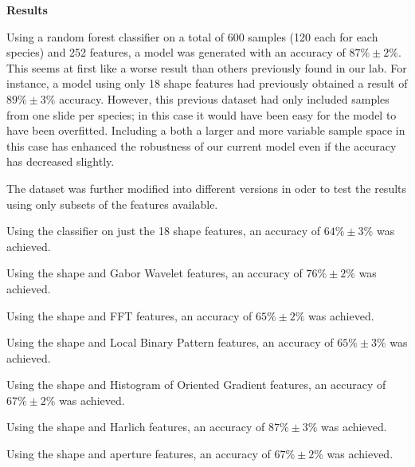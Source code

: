 \textbf{Results}

Using a random forest classifier on a total of 600 samples (120 each for each species) and 252 features, a model was generated with an accuracy of $87\% \pm 2\%$. This seems at first like a worse result than others previously found in our lab. For instance, a model using only 18 shape features had previously obtained a result of $89\% \pm 3\%$ accuracy. However, this previous dataset had only included samples from one slide per species; in this case it would have been easy for the model to have been overfitted. Including a both a larger and more variable sample space in this case has enhanced the robustness of our current model even if the accuracy has decreased slightly.

The dataset was further modified into different versions in oder to test the results using only subsets of the features available.

Using the classifier on just the 18 shape features, an accuracy of  $64\% \pm 3\%$ was achieved.

Using the shape and Gabor Wavelet features, an accuracy of $76\% \pm 2\%$ was achieved.

Using the shape and FFT features, an accuracy of $65\% \pm 2\%$ was achieved.

Using the shape and Local Binary Pattern features, an accuracy of $65\% \pm 3\%$ was achieved.

Using the shape and Histogram of Oriented Gradient features, an accuracy of $67\% \pm 2\%$ was achieved.

Using the shape and Harlich features, an accuracy of $87\% \pm 3\%$ was achieved.

Using the shape and aperture features, an accuracy of $67\% \pm 2\%$ was achieved.

  